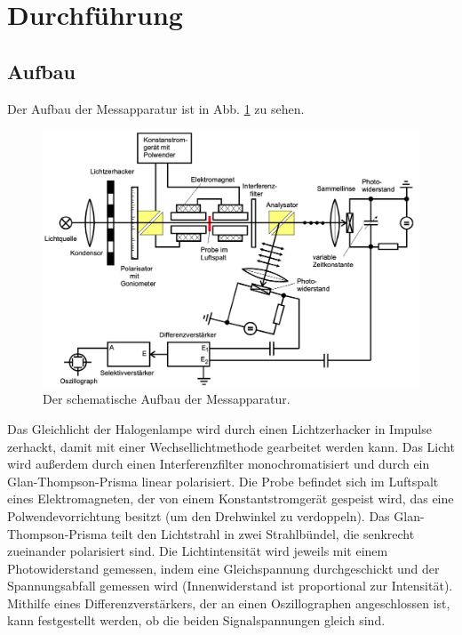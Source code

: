 \section{Durchführung}
\label{sec:Durchführung}

\subsection{Aufbau}
Der Aufbau der Messapparatur ist in Abb. \ref{fig:Aufbau} zu sehen.
\begin{figure}
    \centering
    \includegraphics[width=15cm]{fotos/Aufbau.png}
    \caption{Der schematische Aufbau der Messapparatur. \cite{V46}}
    \label{fig:Aufbau}
\end{figure}
Das Gleichlicht der Halogenlampe wird durch einen Lichtzerhacker in Impulse zerhackt, damit mit einer Wechsellichtmethode gearbeitet werden kann. Das Licht wird außerdem durch einen Interferenzfilter monochromatisiert und durch ein Glan-Thompson-Prisma linear polarisiert. Die Probe befindet sich im Luftspalt eines Elektromagneten, der von einem Konstantstromgerät gespeist wird, das eine Polwendevorrichtung besitzt (um den Drehwinkel zu verdoppeln). Das Glan-Thompson-Prisma teilt den Lichtstrahl in zwei Strahlbündel, die senkrecht zueinander polarisiert sind. Die Lichtintensität wird jeweils mit einem Photowiderstand gemessen, indem eine Gleichspannung durchgeschickt und der Spannungsabfall gemessen wird (Innenwiderstand ist proportional zur Intensität). Mithilfe eines Differenzverstärkers, der an einen Oszillographen angeschlossen ist, kann festgestellt werden, ob die beiden Signalspannungen gleich sind.

